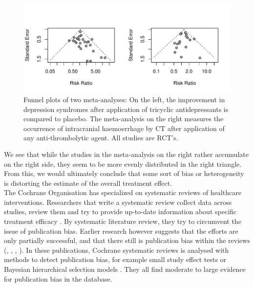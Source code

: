 \documentclass[11pt,a4paper,twoside]{book}\usepackage[]{graphicx}\usepackage[]{color}
\makeatletter
\def\maxwidth{ %
  \ifdim\Gin@nat@width>\linewidth
    \linewidth
  \else
    \Gin@nat@width
  \fi
}
\newenvironment{knitrout}{}{} %
\makeatother
\begin{document}
\begin{figure}
\begin{knitrout}
\color{fgcolor}
\includegraphics[width=\maxwidth]{figure/unnamed-chunk-1-1} 

\end{knitrout}
\caption{Funnel plots of two meta-analyses: On the left, the improvement in depression syndromes after application of tricyclic antidepressants is compared to placebo. The meta-analysis on the right measures the occurrence of intracranial haemoerrhage by CT after application of any anti-thrombolytic agent. All studies are RCT's.}
\label{small.study.effect.examples}
\end{figure}


We see that while the studies in the meta-analysis on the right rather accumulate on the right side, they seem to be more evenly distributed in the right triangle. From this, we would ultimately conclude that some sort of bias or heterogeneity is distorting the estimate of the overall treatment effect.\\
The Cochrane Organisation has specialized on systematic reviews of healthcare interventions. Researchers that write a systematic review collect data across studies, review them and try to provide up-to-date information about specific treatment efficacy \citep{cochrane.handbook}. By systematic literature review, they try to circumvent the issue of publication bias.
Earlier research however suggests that the efforts are only partially successful, and that there still is publication bias within the reviews (\citealp{Egger}, \citealp{Ioannidis2007}, \citealp{kicinsky}, \citealp{vanAert.2019}). In these publications, Cochrane systematic reviews is analysed with methods to detect publication bias, for example small study effect tests or Bayesian hierarchical selection models \citep{kicinsky}. They all find moderate to large evidence for publication bias in the database.\\
\end{document}
